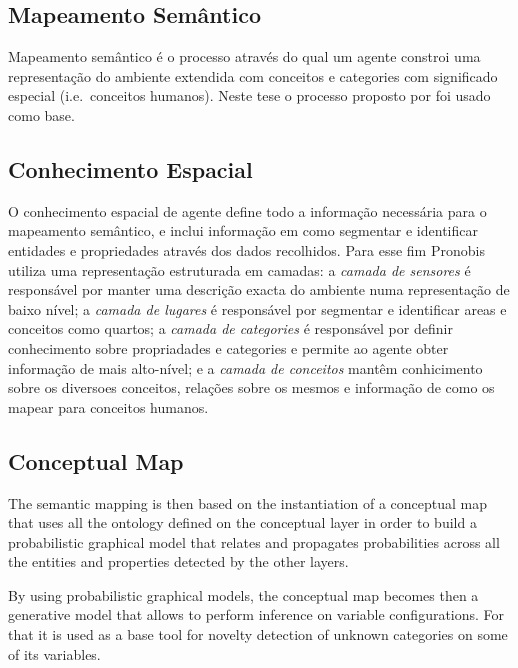 \documentclass[9pt,a4paper]{extarticle}
\begin{document}
\begin{multicols}{2}
\section{Mapeamento Semântico}
Mapeamento semântico é o processo através do qual um agente constroi uma representação do ambiente
extendida com conceitos e categories com significado especial (i.e.\ conceitos humanos).
Neste tese o processo proposto por \cite{pronobis2011phd} foi usado como base.

\subsection{Conhecimento Espacial}
O conhecimento espacial de agente define todo a informação necessária para o mapeamento semântico,
e inclui informação em como segmentar e identificar entidades e propriedades através dos dados
recolhidos.
Para esse fim Pronobis~\cite{pronobis2011semmap} utiliza uma representação estruturada em camadas:
a \emph{camada de sensores} é responsável por manter uma descrição exacta do ambiente numa representação
de baixo nível;
a \emph{camada de lugares} é responsável por segmentar e identificar areas e conceitos
como quartos;
a \emph{camada de categories} é responsável por definir conhecimento sobre propriadades e categories
e permite ao agente obter informação de mais alto-nível;
e a \emph{camada de conceitos} mantêm conhicimento sobre os diversoes conceitos, relações sobre os mesmos
e informação de como os mapear para conceitos humanos.

\subsection{Conceptual Map}
The semantic mapping is then based on the instantiation of a conceptual map that uses all the
ontology defined on the conceptual layer in order to build a probabilistic graphical model that
relates and propagates probabilities across all the entities and properties detected by the
other layers.

By using probabilistic graphical models, the conceptual map becomes then a generative model that
allows to perform inference on variable configurations. For that it is used as a base tool
for novelty detection of unknown categories on some of its variables.


\end{multicols}
\end{document}
